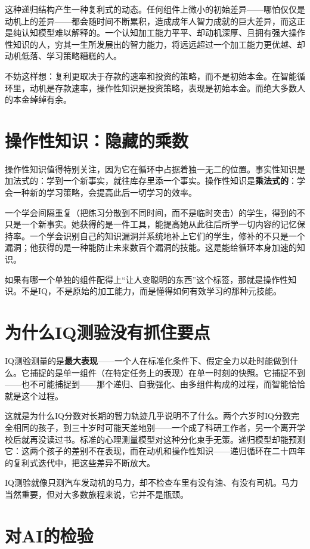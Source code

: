 \documentclass[11pt, twoside, openright]{book}
\begin{document}
这种递归结构产生一种复利式的动态。任何组件上微小的初始差异------哪怕仅仅是动机上的差异------都会随时间不断累积，造成成年人智力成就的巨大差异，而这正是纯认知模型难以解释的。一个认知加工能力平平、却动机深厚、且拥有强大操作性知识的人，穷其一生所发展出的智力能力，将远远超过一个加工能力更优越、却动机低落、学习策略糟糕的人。

不妨这样想：复利更取决于存款的速率和投资的策略，而不是初始本金。在智能循环里，动机是存款速率，操作性知识是投资策略，表现是初始本金。而绝大多数人的本金绰绰有余。

\section*{操作性知识：隐藏的乘数}

操作性知识值得特别关注，因为它在循环中占据着独一无二的位置。事实性知识是加法式的：学到一个新事实，就往库存里添一个事实。操作性知识是\textbf{乘法式的}：学会一种新的学习策略，会提高此后一切学习的效率。

一个学会间隔重复（把练习分散到不同时间，而不是临时突击）的学生，得到的不只是一个新事实。她获得的是一件工具，能提高她从此往后所学一切内容的记忆保持率。一个学会识别自己的知识漏洞并系统地补上它们的学生，修补的不只是一个漏洞；他获得的是一种能防止未来数百个漏洞的技能。这是能给循环本身加速的知识。

如果有哪一个单独的组件配得上“让人变聪明的东西”这个标签，那就是操作性知识。不是IQ，不是原始的加工能力，而是懂得如何有效学习的那种元技能。

\section*{为什么IQ测验没有抓住要点}

IQ测验测量的是\textbf{最大表现}------一个人在标准化条件下、假定全力以赴时能做到什么。它捕捉的是单一组件（在特定任务上的表现）在单一时刻的快照。它捕捉不到------也不可能捕捉到------那个递归、自我强化、由多组件构成的过程，而智能恰恰就是这个过程。

这就是为什么IQ分数对长期的智力轨迹几乎说明不了什么。两个六岁时IQ分数完全相同的孩子，到三十岁时可能天差地别------一个成了科研工作者，另一个离开学校后就再没读过书。标准的心理测量模型对这种分化束手无策。递归模型却能预测它：这两个孩子的差别不在表现，而在动机和操作性知识------递归循环在二十四年的复利式迭代中，把这些差异不断放大。

IQ测验就像只测汽车发动机的马力，却不检查车里有没有油、有没有司机。马力当然重要，但对大多数旅程来说，它并不是瓶颈。

\section*{对AI的检验}
\end{document}
